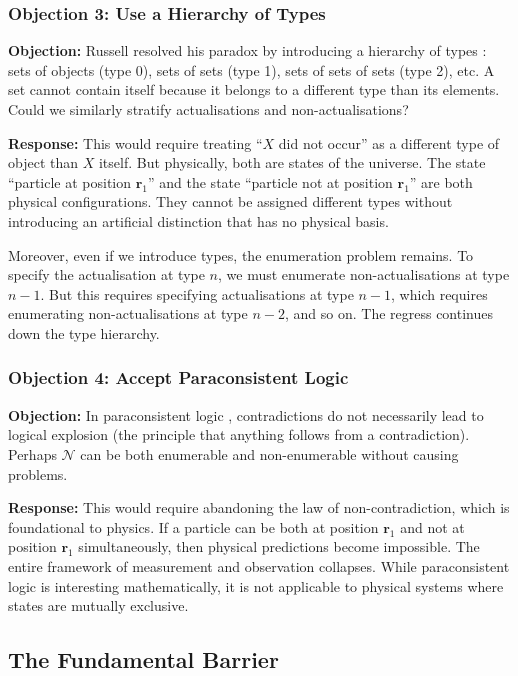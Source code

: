 \documentclass[twocolumn,10pt]{article}
\theoremstyle{definition}
\theoremstyle{remark}
\begin{document}
\subsubsection{Objection 3: Use a Hierarchy of Types}

\textbf{Objection:} Russell resolved his paradox by introducing a hierarchy of types \cite{russell1908}: sets of objects (type 0), sets of sets (type 1), sets of sets of sets (type 2), etc. A set cannot contain itself because it belongs to a different type than its elements. Could we similarly stratify actualisations and non-actualisations?

\textbf{Response:} This would require treating ``$X$ did not occur'' as a different type of object than $X$ itself. But physically, both are states of the universe. The state ``particle at position $\mathbf{r}_1$'' and the state ``particle not at position $\mathbf{r}_1$'' are both physical configurations. They cannot be assigned different types without introducing an artificial distinction that has no physical basis.

Moreover, even if we introduce types, the enumeration problem remains. To specify the actualisation at type $n$, we must enumerate non-actualisations at type $n-1$. But this requires specifying actualisations at type $n-1$, which requires enumerating non-actualisations at type $n-2$, and so on. The regress continues down the type hierarchy.

\subsubsection{Objection 4: Accept Paraconsistent Logic}

\textbf{Objection:} In paraconsistent logic \cite{priest2002}, contradictions do not necessarily lead to logical explosion (the principle that anything follows from a contradiction). Perhaps $\mathcal{N}$ can be both enumerable and non-enumerable without causing problems.

\textbf{Response:} This would require abandoning the law of non-contradiction, which is foundational to physics. If a particle can be both at position $\mathbf{r}_1$ and not at position $\mathbf{r}_1$ simultaneously, then physical predictions become impossible. The entire framework of measurement and observation collapses. While paraconsistent logic is interesting mathematically, it is not applicable to physical systems where states are mutually exclusive.

\subsection{The Fundamental Barrier}
\end{document}
